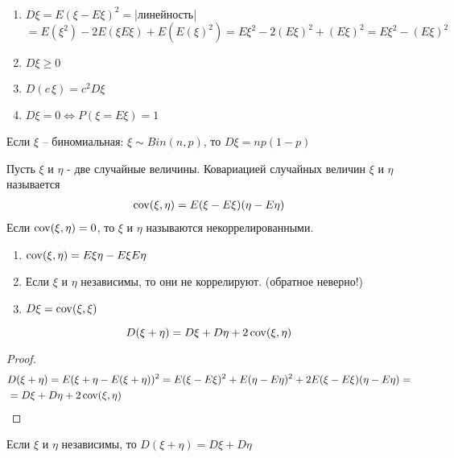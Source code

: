 \begin{lemma}~
	\begin{enumerate}
		\item $D\xi = E(\xi - E\xi)^2 = $|линейность|$ = E(\xi^2) - 2E(\xi E\xi) + E(E(\xi)^2) = E\xi^2 - 2(E\xi)^2 + (E\xi)^2  =E\xi^2 - (E\xi)^2$
		\item $D\xi \geq 0$
		\item $D(c\, \xi) = c^2 D\xi$
		\item $D\xi = 0 \iff P(\xi = E\xi) = 1$
	\end{enumerate}
\end{lemma}

\begin{statement}
	Если $\xi$ -- биномиальная: $\xi \sim Bin(n, p)$, то $D\xi = np (1 - p)$
\end{statement}

\begin{definition}
	Пусть $\xi$ и $\eta$ - две случайные величины. Ковариацией случайных величин $\xi$ и $\eta$ называется
	\begin{align*}
		\operatorname{cov}(\xi, \eta) = E(\xi - E\xi) (\eta - E\eta)
	\end{align*}
	Если $\operatorname{cov}(\xi, \eta) = 0$, то $\xi$ и $\eta$ называются некоррелированными.
\end{definition}

\begin{enumerate}
	\item $\operatorname{cov}(\xi, \eta) = E \xi \eta - E \xi E \eta$

	\item Если $\xi$ и $\eta$ независимы, то они не коррелируют. (обратное неверно!)

	\item $D\xi = \operatorname{cov}(\xi, \xi)$
\end{enumerate}

\begin{statement}
	\begin{equation*}
		D(\xi + \eta) = D\xi + D\eta + 2 \operatorname{cov}(\xi, \eta)
	\end{equation*}
\end{statement}

\begin{proof}
	\begin{align*}
		&D(\xi + \eta) = E(\xi + \eta - E(\xi + \eta))^2 = E(\xi - E\xi)^2 + E(\eta - E\eta)^2
		+ 2 E(\xi - E\xi)(\eta - E\eta) = \\ 
		&= D\xi + D\eta + 2 \operatorname{cov}(\xi, \eta)
	\end{align*}
\end{proof}

\begin{corollary}
	Если $\xi$ и $\eta$ независимы, то $D(\xi + \eta) = D\xi + D\eta$
\end{corollary}

